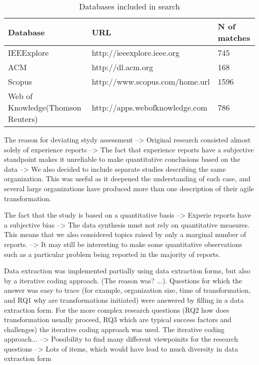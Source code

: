 \documentclass[preprint,authoryear,12pt]{elsarticle}
\begin{document}
\begin{table}
    \begin{tabular}{ p{} l l }
        \toprule
        Database      & URL                     & N of matches   \\
        \midrule
        IEEExplore    & http://ieeexplore.ieee.org      & 745 \\ 
        ACM           & http://dl.acm.org               & 168 \\
        Scopus        & http://www.scopus.com/home.url  & 1596 \\
        Web of Knowledge\newline(Thomson Reuters) &
        http://apps.webofknowledge.com & 786 \\
        \bottomrule
    \end{tabular}
    \caption{Databases included in search}
    \label{table:databases}
\end{table}


The reason for deviating stydy assessment
--> Original research consisted almost solely of experience reports
--> The fact that experience reports have a subjective standpoint makes it
    unreliable to make quantitative conclusions based on the data
--> We also decided to include separate studies describing the same organization.
    This was useful as it deepened the understanding of each case, and several
    large organizations have produced more than one description of their agile
    transformation.

The fact that the study is based on a quantitative basis
--> Experie reports have a subjective bias
--> The data synthesis must not rely on quantitative measures. This means that
    we also considered topics raised by only a marginal number of reports.
--> It may still be interesting to make some quantitative observations such as
    a particular problem being reported in the majority of reports.


Data extraction was implemented partially using data extraction forms, but also
by a iterative coding approach. (The reason was? ...). Questions for which the
answer was easy to trace (for example, organization size, time of
transformation, and RQ1 why are transformations initiated) were answered by
filling in a data extraction form. For the more complex research questions (RQ2
how does transformation usually proceed, RQ3 which are typical success factors
and challenges) the iterative coding approach was used. The iterative coding
approach...
--> Possibility to find many different viewpoinits for the research questions
--> Lots of items, which would have lead to much diversity in data extraction form 
\end{document}
